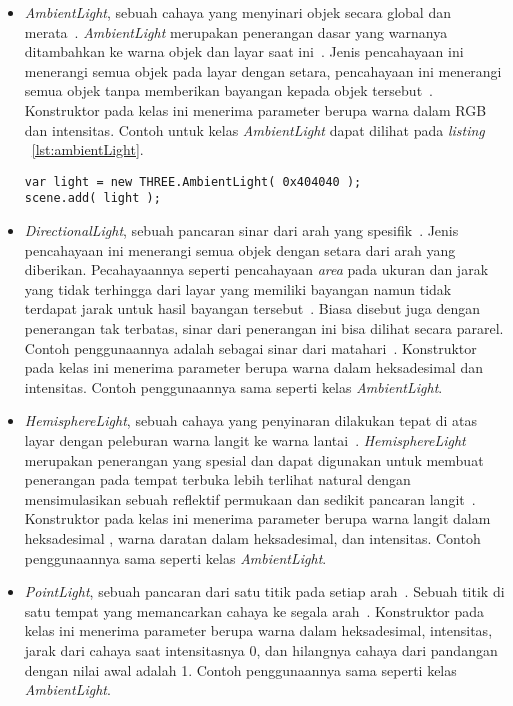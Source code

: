 \begin{itemize}
	\begin{itemize}
		\item {\it AmbientLight}, sebuah cahaya yang menyinari objek secara global dan merata~\cite{threejs}. {\it AmbientLight} merupakan penerangan dasar yang warnanya ditambahkan ke warna objek dan layar saat ini~\cite{learningThreejs}. Jenis pencahayaan ini menerangi semua objek pada layar dengan setara, pencahayaan ini menerangi semua objek tanpa memberikan bayangan kepada objek tersebut~\cite{conceptShading}. Konstruktor pada kelas ini menerima parameter berupa warna dalam RGB dan intensitas. Contoh untuk kelas {\it AmbientLight} dapat dilihat pada {\it listing} ~\ref{lst:ambientLight}.
\begin{lstlisting}[caption={Contoh penggunaan kelas {\it AmbientLight}.}, label={lst:ambientLight},captionpos=b]
var light = new THREE.AmbientLight( 0x404040 ); 
scene.add( light );
\end{lstlisting}
		\item {\it DirectionalLight}, sebuah pancaran sinar dari arah yang spesifik~\cite{threejs}. Jenis pencahayaan ini menerangi semua objek dengan setara dari arah yang diberikan. Pecahayaannya seperti pencahayaan {\it area} pada ukuran dan jarak yang tidak terhingga dari layar yang memiliki bayangan namun tidak terdapat jarak untuk hasil bayangan tersebut~\cite{conceptShading}. Biasa disebut juga dengan penerangan tak terbatas, sinar dari penerangan ini bisa dilihat secara pararel. Contoh penggunaannya adalah sebagai sinar dari matahari~\cite{learningThreejs}. Konstruktor pada kelas ini menerima parameter berupa warna dalam heksadesimal dan intensitas. Contoh penggunaannya sama seperti kelas {\it AmbientLight}.
		\item {\it HemisphereLight}, sebuah cahaya yang penyinaran dilakukan tepat di atas layar dengan peleburan warna langit ke warna lantai~\cite{threejs}. {\it HemisphereLight} merupakan penerangan yang spesial dan dapat digunakan untuk  membuat penerangan pada tempat terbuka lebih terlihat natural dengan mensimulasikan sebuah reflektif permukaan dan sedikit pancaran langit~\cite{learningThreejs}. Konstruktor pada kelas ini menerima parameter berupa warna langit dalam heksadesimal , warna daratan dalam heksadesimal, dan intensitas. Contoh penggunaannya sama seperti kelas {\it AmbientLight}.
		\item {\it PointLight}, sebuah pancaran dari satu titik pada setiap arah~\cite{threejs}. Sebuah titik di satu tempat yang memancarkan cahaya ke segala arah~\cite{learningThreejs}. Konstruktor pada kelas ini menerima parameter berupa warna dalam heksadesimal, intensitas, jarak dari cahaya saat intensitasnya 0, dan hilangnya cahaya dari pandangan dengan nilai awal adalah 1. Contoh penggunaannya sama seperti kelas {\it AmbientLight}.

\end{itemize}
\end{itemize}
